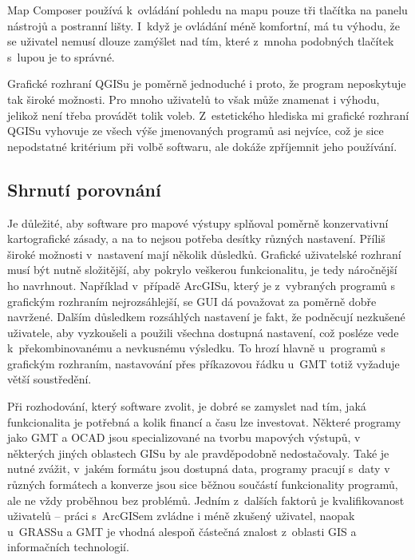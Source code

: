\documentclass[a4paper,12pt,draft]{article}
\begin{document}
Map Composer používá k~ovládání pohledu na mapu pouze tři tlačítka
na panelu nástrojů a postranní lišty. I~když je ovládání méně
komfortní, má tu výhodu, že se uživatel nemusí dlouze zamýšlet nad
tím, které z~mnoha podobných tlačítek s~lupou je to správné.

Grafické rozhraní QGISu je poměrně jednoduché i proto, že program
neposkytuje tak široké možnosti. Pro mnoho uživatelů to však
může znamenat i výhodu, jelikož není třeba provádět tolik voleb.
Z~estetického hlediska mi grafické rozhraní QGISu vyhovuje ze všech výše
jmenovaných programů asi nejvíce, což je sice nepodstatné kritérium
při volbě softwaru, ale dokáže zpříjemnit jeho používání.

\subsection{Shrnutí porovnání}
Je důležité, aby software pro mapové výstupy splňoval poměrně
konzervativní kartografické zásady, a na to nejsou potřeba
desítky různých nastavení. Příliš široké možnosti v~nastavení
mají několik důsledků. Grafické uživatelské rozhraní musí být nutně
složitější, aby pokrylo veškerou funkcionalitu, je tedy náročnější
ho navrhnout. Například v~případě ArcGISu, který je z~vybraných programů s
grafickým rozhraním nejrozsáhlejší, se GUI dá považovat za poměrně dobře
navržené. 
Dalším důsledkem rozsáhlých nastavení je fakt, že podněcují nezkušené uživatele,
aby vyzkoušeli a použili všechna dostupná nastavení, což posléze vede
k~překombinovanému a nevkusnému výsledku. To hrozí hlavně u~programů s
grafickým rozhraním, nastavování přes příkazovou řádku u~GMT totiž vyžaduje
větší soustředění.

Při rozhodování, který software zvolit, je dobré se zamyslet nad tím, jaká
funkcionalita je potřebná a kolik financí a času lze investovat. Některé
programy jako GMT a OCAD jsou specializované na tvorbu mapových výstupů, v
některých jiných oblastech GISu by ale pravděpodobně nedostačovaly. Také je
nutné zvážit, v~jakém formátu jsou dostupná data, programy pracují s~daty v
různých formátech a konverze jsou sice běžnou součástí funkcionality programů,
ale ne vždy proběhnou bez problémů. Jedním z~dalších faktorů je kvalifikovanost
uživatelů -- práci s~ArcGISem zvládne i méně zkušený uživatel, naopak u~GRASSu
a GMT je vhodná alespoň částečná znalost z~oblasti GIS a informačních
technologií.
\end{document}
